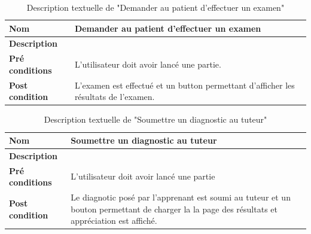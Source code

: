     \begin{table}[H]
        \centering
        \begin{tabular}{|p{}|p{}|}
            \hline
            \textbf{Nom} & Demander au patient d'effectuer un examen\\
            \hline
            \textbf{Description}& \\ 
            \hline
            \textbf{Pré conditions}& L'utilisateur doit avoir lancé une partie.\\ 
            \hline
            \textbf{Post condition}& L'examen est effectué et un button permettant d'afficher les résultats de l'examen.\\
            \hline
        \end{tabular}
        
        \captionsetup{justification=centering}
        \caption{Description textuelle de "Demander au patient d'effectuer un examen"}
        \label{tab:examen_use_case}
        
    \end{table}
     \begin{table}[H]
        \centering
        \begin{tabular}{|p{}|p{}|}
            \hline
            \textbf{Nom} &  Soumettre un diagnostic au tuteur\\
            \hline
            \textbf{Description}& \\ 
            \hline
            \textbf{Pré conditions}& L'utilisateur doit avoir lancé une partie \\ 
            \hline
            \textbf{Post condition}& Le diagnotic posé par l'apprenant est soumi au tuteur et un bouton permettant de charger la la page des résultats et appréciation est affiché.\\
            \hline
        \end{tabular}
        \captionsetup{justification=centering}
        \caption{Description textuelle de "Soumettre un diagnostic au tuteur"}
        \label{tab:diagnostic_use_case}
    \end{table}
    
